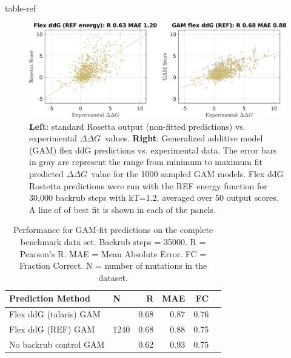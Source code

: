 \documentclass{article}
\newcommand\ddg{$\Delta\Delta G$}
\begin{document}
{table-ref}

\begin{figure}
  \includegraphics[width=\textwidth,keepaspectratio]{figures/zemu-sigmoid2-corrs-supp.png}
  \caption[]{
    \textbf{Left}: standard Rosetta output (non-fitted predictions) vs. experimental \ddg\ values.
    \textbf{Right}: Generalized additive model (GAM) flex ddG predictions vs. experimental data.
    The error bars in gray are represent the range from minimum to maximum fit predicted \ddg\ value for the 1000 sampled GAM models.
    Flex ddG Rostetta predictions were run with the REF energy function for 30,000 backrub steps with kT=1.2, averaged over 50 output scores.
    A line of of best fit is shown in each of the panels.
  } \label{fig:t14-fit-scatter-supp}
\end{figure}

\begin{table}
  \begin{tabular}{llrrrr}
\toprule
Prediction Method &     N &    R &  MAE &   FC \\
\midrule
 Flex ddG (talaris) GAM & \multirow{ 4}{*}{1240} & 0.68 & 0.87 & 0.76 \\
 Flex ddG (REF) GAM & & 0.68 & 0.88 & 0.75  \\
 No backrub control GAM & & 0.62 & 0.93 & 0.75  \\
\bottomrule
\end{tabular}
  \caption[]{
    Performance for GAM-fit predictions on the complete benchmark data set. Backrub steps = 35000. R = Pearson's R. MAE = Mean Absolute Error. FC = Fraction Correct. N = number of mutations in the dataset.
  } \label{tab:table-gam-fit}
\end{table}
\end{document}
